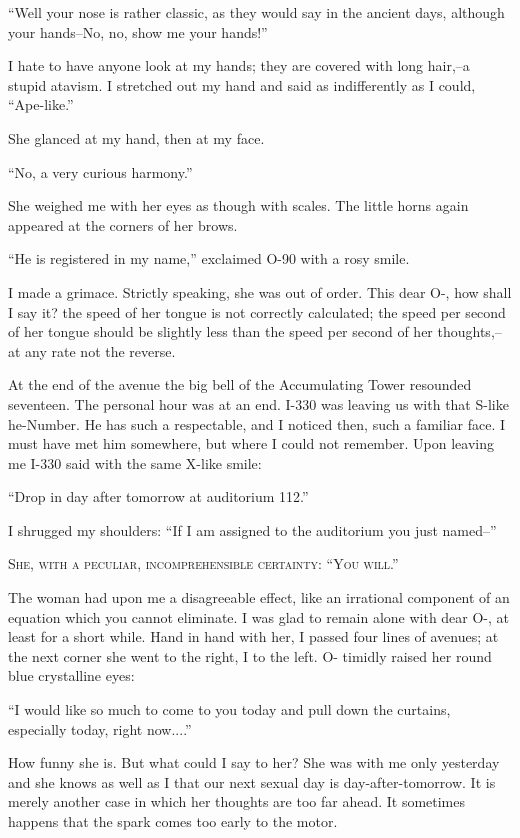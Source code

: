 \documentclass[11pt,openany]{book}
\begin{document}
``Well your nose is rather classic, as they would say in the ancient days, although your hands--No, no, show me your hands!''

I hate to have anyone look at my hands; they are covered with long hair,--a stupid atavism. I stretched out my hand and said as indifferently as I could, ``Ape-like.''

She glanced at my hand, then at my face.

``No, a very curious harmony.''

She weighed me with her eyes as though with scales. The little horns again appeared at the corners of her brows.

``He is registered in my name,'' exclaimed O-90 with a rosy smile.

I made a grimace. Strictly speaking, she was out of order. This dear O-, how shall I say it? the speed of her tongue is not correctly calculated; the speed per second of her tongue should be slightly less than the speed per second of her thoughts,--at any rate not the reverse.

At the end of the avenue the big bell of the Accumulating Tower resounded seventeen. The personal hour was at an end. I-330 was leaving us with that S-like he-Number. He has such a respectable, and I noticed then, such a familiar face. I must have met him somewhere, but where I could not remember. Upon leaving me I-330 said with the same X-like smile:

``Drop in day after tomorrow at auditorium 112.''

I shrugged my shoulders: ``If I am assigned to the auditorium you just named--''

\begin{center}\textsc{She, with a peculiar, incomprehensible certainty: ``You will.''}\end{center}

The woman had upon me a disagreeable effect, like an irrational component of an equation which you cannot eliminate. I was glad to remain alone with dear O-, at least for a short while. Hand in hand with her, I passed four lines of avenues; at the next corner she went to the right, I to the left. O- timidly raised her round blue crystalline eyes:

``I would like so much to come to you today and pull down the curtains, especially today, right now....''

How funny she is. But what could I say to her? She was with me only yesterday and she knows as well as I that our next sexual day is day-after-tomorrow. It is merely another case in which her thoughts are too far ahead. It sometimes happens that the spark comes too early to the motor.
\end{document}
